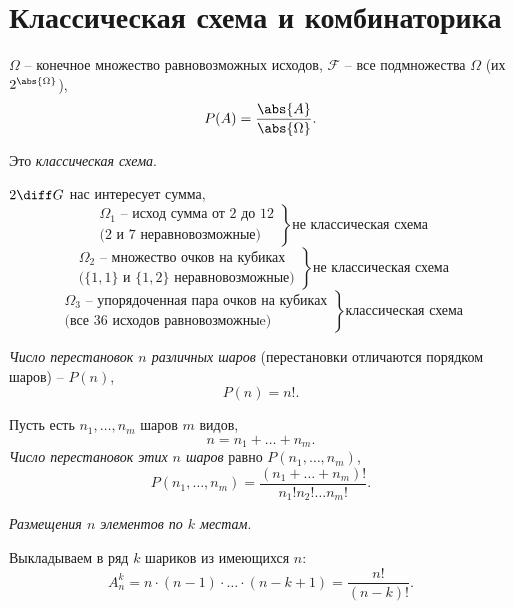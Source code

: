 \chapter{Классическая схема и комбинаторика}

\begin{definition}
  $\Omega$ -- конечное множество равновозможных исходов, $\mathcal{F}$ -- все подмножества $\Omega$ (их $2^{\abs{\Omega}}$),
  \[
    P(A) = \frac{\abs{A}}{\abs{\Omega}}.
  \]

  Это \emph{классическая схема}.
\end{definition}

\begin{eg}
  $2 \diff G$ нас интересует сумма,
  \[
    \left.\begin{array}{c}
      \Omega_{1} \text{ -- исход сумма от 2 до 12} \\
      \text{(2 и 7 неравновозможные)}
    \end{array}\right\} \text{не классическая схема}
  \]
  \[
    \left.\begin{array}{c}
      \Omega_{2} \text{ -- множество очков на кубиках} \\
      \text{($\{1,1\}$ и $\{1,2\}$ неравновозможные)}
    \end{array}\right\} \text{не классическая схема}
  \]
  \[
    \left.\begin{array}{c}
      \Omega_{3} \text{ -- упорядоченная пара очков на кубиках} \\
      \text{(все 36 исходов равновозможныe)}
    \end{array}\right\} \text{классическая схема}
  \]
\end{eg}

\begin{definition}
  \emph{Число перестановок $n$ различных шаров} (перестановки отличаются порядком шаров) -- $P(n)$,
  \[
    P(n) = n!.
  \]
\end{definition}

\begin{definition}
  Пусть есть $n_1,\ldots,n_m$ шаров $m$ видов,
  \[
    n = n_1 + \ldots + n_m.
  \]
  \emph{Число перестановок этих $n$ шаров} равно $P(n_1,\ldots,n_m)$,
  \[
    P(n_1,\ldots,n_m) = \frac{(n_1+\ldots+n_m)!}{n_1!n_2!\ldots n_m!}.
  \]
\end{definition}

\begin{definition}
  \emph{Размещения $n$ элементов по $k$ местам}.

  Выкладываем в ряд $k$ шариков из имеющихся $n$:
  \[
    A^{k}_{n} = n \cdot (n-1) \cdot \ldots \cdot (n-k+1) = \frac{n!}{(n-k)!}.
  \]
\end{definition}

